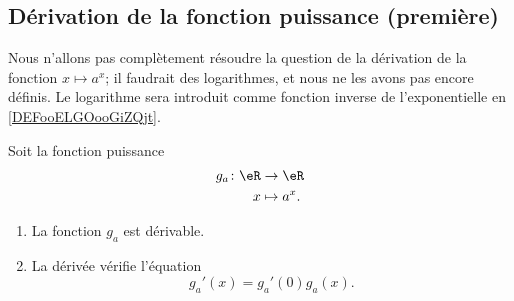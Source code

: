 \subsection{Dérivation de la fonction puissance (première)}

Nous n'allons pas complètement résoudre la question de la dérivation de la fonction \( x\mapsto a^x\); il faudrait des logarithmes, et nous ne les avons pas encore définis. Le logarithme sera introduit comme fonction inverse de l'exponentielle en \ref{DEFooELGOooGiZQjt}.

\begin{proposition}       \label{PROPooMXCDooBffXbl}
	Soit la fonction puissance
	\begin{equation}
		\begin{aligned}
			g_a\colon \eR & \to \eR      \\
			x             & \mapsto a^x.
		\end{aligned}
	\end{equation}
	\begin{enumerate}
		\item
		      La fonction \( g_a\) est dérivable.
		\item
		      La dérivée vérifie l'équation
		      \begin{equation}        \label{EQooNIUJooPqDnax}
			      g_a'(x)=g_a'(0)g_a(x).
		      \end{equation}
	\end{enumerate}
\end{proposition}

